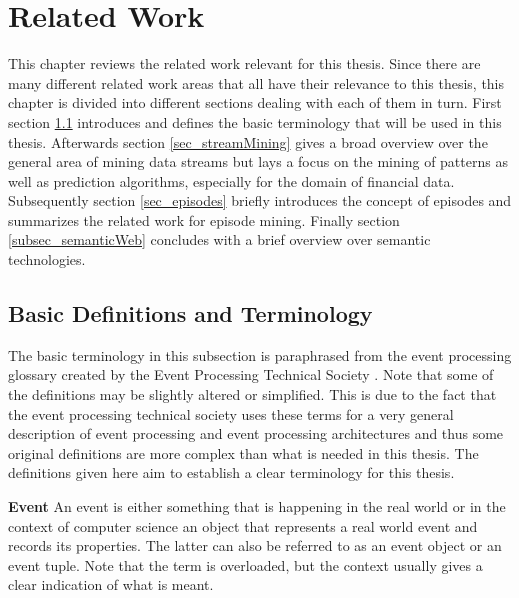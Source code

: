 
\chapter{Related Work}
\label{chapter_related}

\ifpdf
    \graphicspath{{Chapter2/Figs/Raster/}{Chapter2/Figs/PDF/}{Chapter2/Figs/}}
\else
    \graphicspath{{Chapter2/Figs/Vector/}{Chapter2/Figs/}}
\fi

This chapter reviews the related work relevant for this thesis. Since there are many different related work areas that all have their relevance to this thesis, this chapter is divided into different sections dealing with each of them in turn. First section \ref{sec_basicDefinitions} introduces and defines the basic terminology that will be used in this thesis. Afterwards section \ref{sec_streamMining} gives a broad overview over the general area of mining data streams but lays a focus on the mining of patterns as well as prediction algorithms, especially for the domain of financial data. Subsequently section \ref{sec_episodes} briefly introduces the concept of episodes and summarizes the related work for episode mining. Finally section \ref{subsec_semanticWeb} concludes with a brief overview over semantic technologies.


\section{Basic Definitions and Terminology}
\label{sec_basicDefinitions}
The basic terminology in this subsection is paraphrased from the event processing glossary created by the Event Processing Technical Society \cite{luckham2011epts}. Note that some of the definitions may be slightly altered or simplified. This is due to the fact that the event processing technical society uses these terms for a very general description of event processing and event processing architectures and thus some original definitions are more complex than what is needed in this thesis. The definitions given here aim to establish a clear terminology for this thesis.

\begin{mydef}
\textbf{Event} An event is either something that is happening in the real world or in the context of computer science an object that represents a real world event and records its properties. The latter can also be referred to as an event object or an event tuple. Note that the term is overloaded, but the context usually gives a clear indication of what is meant.
\end{mydef}

